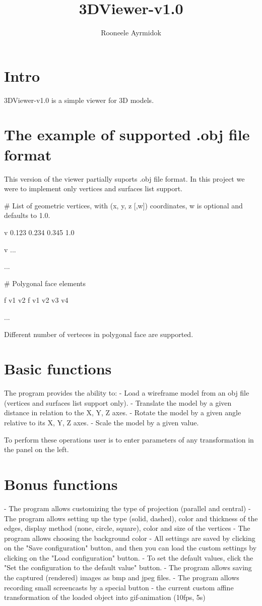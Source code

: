 \documentclass[12pt, a4paper]{report}
\title{3DViewer-v1.0}
\author{Rooneele Ayrmidok}
\begin{document}
\section{Intro}
3DViewer-v1.0 is a simple viewer for 3D models. 

\section{The example of supported .obj file format}
This version of the viewer partially suports .obj file format.
In this project we were to implement only vertices and surfaces list support.


  \# List of geometric vertices, with (x, y, z [,w]) coordinates, w is optional and defaults to 1.0.
  
  v 0.123 0.234 0.345 1.0
  
  v ...
  
  ...
  
  \# Polygonal face elements
  
  f v1 v2
  f v1 v2 v3 v4

  ...
  
Different number of verteces in polygonal face are supported.

\section{Basic functions}
The program provides the ability to:
- Load a wireframe model from an obj file (vertices and surfaces list support only).
- Translate the model by a given distance in relation to the X, Y, Z axes.
- Rotate the model by a given angle relative to its X, Y, Z axes.
- Scale the model by a given value.

To perform these operations user is to enter parameters of any
transformation in the panel on the left.

\section{Bonus functions}
- The program allows customizing the type of projection (parallel and central)
- The program allows setting up the type (solid, dashed), color and thickness of the edges, display method (none, circle, square), color and size of the vertices
- The program allows choosing the background color
- All settings are saved by clicking on the "Save configuration" button, and then you can load the custom settings by clicking on the "Load configuration" button.
- To set the default values, click the "Set the configuration to the default value" button.
- The program allows saving the captured (rendered) images as bmp and jpeg files.
- The program allows recording small screencasts by a special button - the current custom affine transformation of the loaded object into gif-animation (10fps, 5s)
\end{document}
